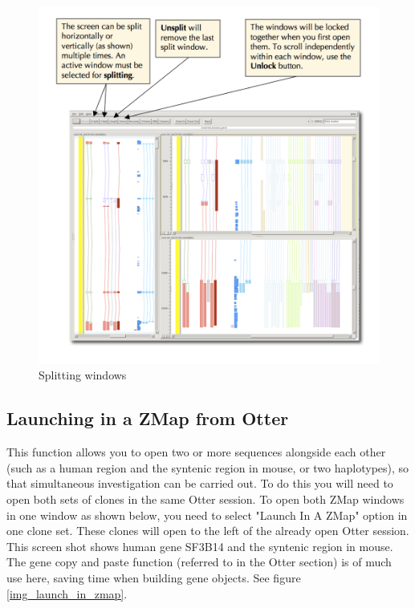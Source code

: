 \documentclass[letterpaper]{article}
\begin{document}
\begin{figure}
\centering
\color[rgb]{0.30980393,0.5058824,0.7411765}
\includegraphics[width=15.231cm]{img_split_window.png}
\caption{Splitting windows}
\label{img_split_window}
\end{figure}

\subsection{Launching in a ZMap from Otter}
This function allows you to open two or more sequences alongside each other (such as a human region and the syntenic region in mouse, or two haplotypes), so that simultaneous investigation can be carried out. To do this you will need to open both sets of clones in the same Otter session. To open both ZMap windows in one window as shown below, you need to select "Launch In A ZMap" option in one clone set. These clones will open to the left of the already open Otter session. This screen shot shows human gene SF3B14 and the syntenic region in mouse. The gene copy and paste function (referred to in the Otter section) is of much use here, saving time when building gene objects. See figure \ref{img_launch_in_zmap}.
\end{document}
